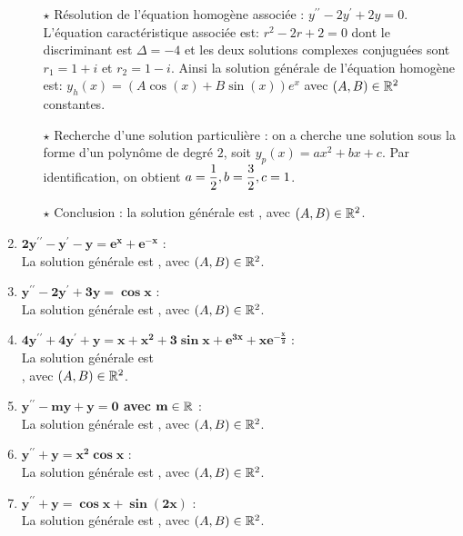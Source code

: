 \documentclass[a4paper, 11pt,reqno]{article}
\begin{document}
\begin{correction}
\begin{enumerate}
\begin{itemize}
            \item[$\star$] R\'esolution de l'\'equation homog\`ene associ\'ee : $y^{\prime\prime}-2y^{\prime}+2y=0$.\\
                  L'\'equation caract\'eristique associ\'ee est: $r^2-2r+2=0$ dont le discriminant est $\Delta=-4$ et les deux solutions complexes conjugu\'ees sont $r_1=1+i$ et $r_2=1-i$. Ainsi la solution g\'en\'erale de l'\'equation homog\`{e}ne est: $y_h(x)= (A \cos{(x)}+B \sin{(x)})e^x$ avec $(A,B)\in\mathbb{R}^2$ constantes.
            \item[$\star$] Recherche d'une solution particuli\`ere : on a cherche une solution sous la forme d'un polyn\^ome de degr\'e $2$, soit $y_p(x) = a x^2 +bx+c$. Par identification, on obtient $a=\displaystyle \frac{1}{2}, b= \frac{3}{2}, c=1$.
            \item[$\star$] Conclusion : la solution g\'en\'erale est , avec $(A,B)\in\mathbb{R}^2$.
          \end{itemize}
    \item $\mathbf{2y^{\prime\prime}-y^{\prime}-y=e^x+e^{-x}}$ :\\
          La solution g\'en\'erale est , avec $(A,B)\in\mathbb{R}^2$.
    \item $\mathbf{y^{\prime\prime}-2y^{\prime}+3y=\cos{x}}$ :\\
          La solution g\'en\'erale est , avec $(A,B)\in\mathbb{R}^2$.
    \item $\mathbf{4y^{\prime\prime}+4y^{\prime}+y=x+x^2+3\sin{x}+e^{3x}+xe^{-\frac{x}{2}}}$ :\\
          La solution g\'en\'erale est  \vsec\\
          , avec $(A,B)\in\mathbb{R}^2$.
    \item \textbf{$\mathbf{y^{\prime\prime}-my+y=0}$ avec $\mathbf{m\in\mathbb{R}}$} :\\
          La solution g\'en\'erale est , avec $(A,B)\in\mathbb{R}^2$.
    \item $\mathbf{y^{\prime\prime}+y=x^2\cos{x}}$ :\\
          La solution g\'en\'erale est , avec $(A,B)\in\mathbb{R}^2$.
    \item $\mathbf{y^{\prime\prime}+y=\cos{x}+\sin{(2x)}}$ :\\
          La solution g\'en\'erale est , avec $(A,B)\in\mathbb{R}^2$.
  \end{enumerate}
\end{correction}
\end{document}
